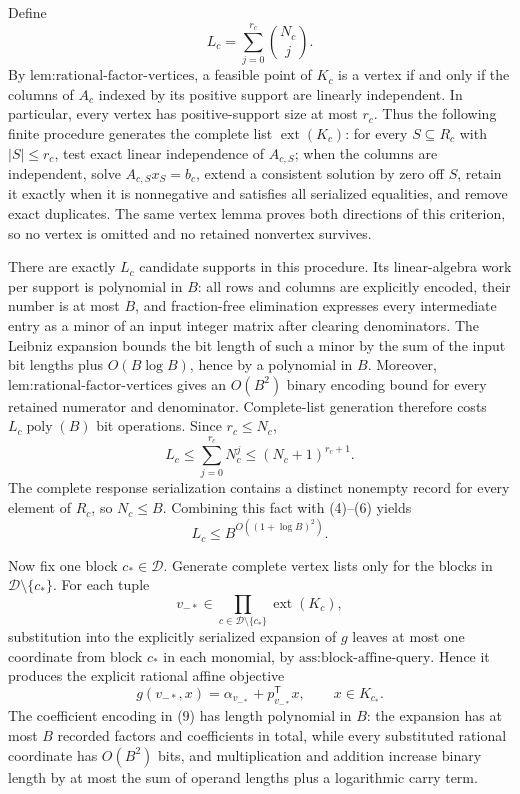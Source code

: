 Define
\[
 L_c=\sum_{j=0}^{r_c}\binom{N_c}{j}.
 \tag{5}
\]
By \(\text{lem:rational-factor-vertices}\), a feasible point of \(K_c\) is a vertex if and only if the columns of \(A_c\) indexed by its positive support are linearly independent.  In particular, every vertex has positive-support size at most \(r_c\).  Thus the following finite procedure generates the complete list \(\operatorname{ext}(K_c)\): for every \(S\subseteq R_c\) with \(|S|\le r_c\), test exact linear independence of \(A_{c,S}\); when the columns are independent, solve \(A_{c,S}x_S=b_c\), extend a consistent solution by zero off \(S\), retain it exactly when it is nonnegative and satisfies all serialized equalities, and remove exact duplicates.  The same vertex lemma proves both directions of this criterion, so no vertex is omitted and no retained nonvertex survives.

There are exactly \(L_c\) candidate supports in this procedure.  Its linear-algebra work per support is polynomial in \(B\): all rows and columns are explicitly encoded, their number is at most \(B\), and fraction-free elimination expresses every intermediate entry as a minor of an input integer matrix after clearing denominators.  The Leibniz expansion bounds the bit length of such a minor by the sum of the input bit lengths plus \(O(B\log B)\), hence by a polynomial in \(B\).  Moreover, \(\text{lem:rational-factor-vertices}\) gives an \(O(B^2)\) binary encoding bound for every retained numerator and denominator.  Complete-list generation therefore costs \(L_c\operatorname{poly}(B)\) bit operations.  Since \(r_c\le N_c\),
\[
 L_c
 \le \sum_{j=0}^{r_c}N_c^j
 \le (N_c+1)^{r_c+1}.
 \tag{6}
\]
The complete response serialization contains a distinct nonempty record for every element of \(R_c\), so \(N_c\le B\).  Combining this fact with (4)--(6) yields
\[
 L_c\le B^{O((1+\log B)^2)}.
 \tag{7}
\]

Now fix one block \(c_*\in\mathcal D\).  Generate complete vertex lists only for the blocks in \(\mathcal D\setminus\{c_*\}\).  For each tuple
\[
 v_{-*}\in
 \prod_{c\in\mathcal D\setminus\{c_*\}}
 \operatorname{ext}(K_c),
 \tag{8}
\]
substitution into the explicitly serialized expansion of \(g\) leaves at most one coordinate from block \(c_*\) in each monomial, by \(\text{ass:block-affine-query}\).  Hence it produces the explicit rational affine objective
\[
 g(v_{-*},x)=\alpha_{v_{-*}}+p_{v_{-*}}^{\mathsf T}x,
 \qquad x\in K_{c_*}.
 \tag{9}
\]
The coefficient encoding in (9) has length polynomial in \(B\): the expansion has at most \(B\) recorded factors and coefficients in total, while every substituted rational coordinate has \(O(B^2)\) bits, and multiplication and addition increase binary length by at most the sum of operand lengths plus a logarithmic carry term.

